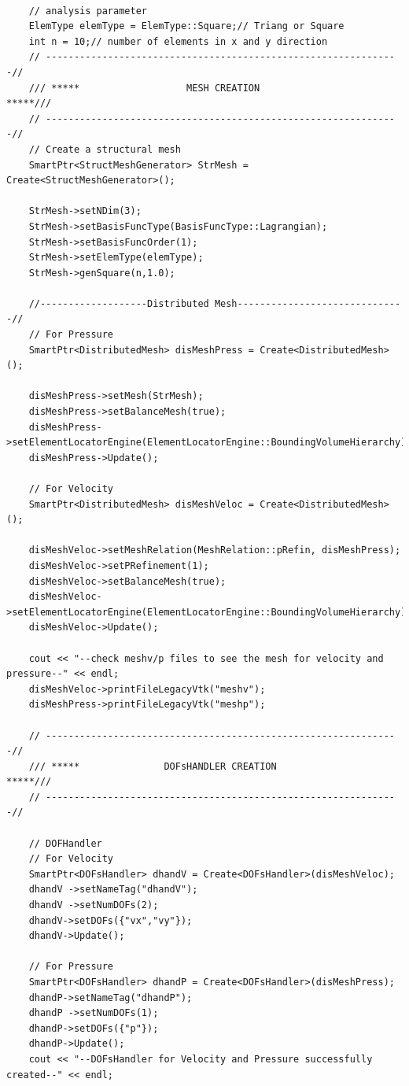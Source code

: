 \documentclass[]{article}
\begin{document}
\begin{lstlisting}
	
	// analysis parameter
	ElemType elemType = ElemType::Square;// Triang or Square
	int n = 10;// number of elements in x and y direction
	// ---------------------------------------------------------------//
	/// *****                   MESH CREATION                   *****///
	// ---------------------------------------------------------------//
	// Create a structural mesh       
	SmartPtr<StructMeshGenerator> StrMesh = Create<StructMeshGenerator>();
	
	StrMesh->setNDim(3);
	StrMesh->setBasisFuncType(BasisFuncType::Lagrangian);
	StrMesh->setBasisFuncOrder(1);
	StrMesh->setElemType(elemType);
	StrMesh->genSquare(n,1.0);
	
	//-------------------Distributed Mesh------------------------------//
	// For Pressure
	SmartPtr<DistributedMesh> disMeshPress = Create<DistributedMesh>();
	
	disMeshPress->setMesh(StrMesh);
	disMeshPress->setBalanceMesh(true);
	disMeshPress->setElementLocatorEngine(ElementLocatorEngine::BoundingVolumeHierarchy);
	disMeshPress->Update();
	
	// For Velocity
	SmartPtr<DistributedMesh> disMeshVeloc = Create<DistributedMesh>();
	
	disMeshVeloc->setMeshRelation(MeshRelation::pRefin, disMeshPress);
	disMeshVeloc->setPRefinement(1);
	disMeshVeloc->setBalanceMesh(true);
	disMeshVeloc->setElementLocatorEngine(ElementLocatorEngine::BoundingVolumeHierarchy);
	disMeshVeloc->Update();
	
	cout << "--check meshv/p files to see the mesh for velocity and pressure--" << endl;
	disMeshVeloc->printFileLegacyVtk("meshv");
	disMeshPress->printFileLegacyVtk("meshp");
	
	// ---------------------------------------------------------------//
	/// *****               DOFsHANDLER CREATION                *****///
	// ---------------------------------------------------------------//
	
	// DOFHandler
	// For Velocity
	SmartPtr<DOFsHandler> dhandV = Create<DOFsHandler>(disMeshVeloc);
	dhandV ->setNameTag("dhandV");
	dhandV ->setNumDOFs(2);
	dhandV->setDOFs({"vx","vy"});
	dhandV->Update();
	
	// For Pressure
	SmartPtr<DOFsHandler> dhandP = Create<DOFsHandler>(disMeshPress);
	dhandP->setNameTag("dhandP");
	dhandP ->setNumDOFs(1);
	dhandP->setDOFs({"p"});
	dhandP->Update(); 
	cout << "--DOFsHandler for Velocity and Pressure successfully created--" << endl;
	

\end{lstlisting}
\end{document}
